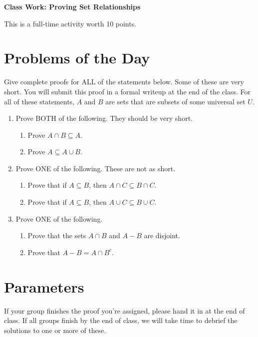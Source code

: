 \documentclass[11pt]{article}
\begin{document}
	
	\thispagestyle{empty}
	\renewcommand{\headrulewidth}{0.0pt}
	\thispagestyle{fancy}
	\lfoot{}
	\cfoot{}
	\rfoot{}	
	
	\vspace*{0in}

		\begin{center}
			\begin{large}
			\textbf{Class Work: Proving Set Relationships} \\
			\end{large}
			This is a full-time activity worth 10 points. 
			
		\end{center}
		

\section*{Problems of the Day}

Give complete proofs for ALL of the statements below. Some of these are very short. You will submit this proof in a formal writeup at the end of the class. For all of these statements, $A$ and $B$ are sets that are subsets of some universal set $U$. 

\begin{enumerate}
	\item Prove BOTH of the following. They should be very short. 
	\begin{enumerate}
		\item Prove $A \cap B \subseteq A$. 
		\item Prove $A \subseteq A \cup B$.
	\end{enumerate}
	\item Prove ONE of the following. These are not as short. 
	\begin{enumerate}
		\item Prove that if $A \subseteq B$, then $A \cap C \subseteq B \cap C$. 
		\item Prove that if $A \subseteq B$, then $A \cup C \subseteq B \cup C$. 
	\end{enumerate}
	\item Prove ONE of the following. 
	\begin{enumerate}
		\item Prove that the sets $A \cap B$ and $A - B$ are disjoint. 
		\item Prove that $A - B = A \cap B^c$. 
	\end{enumerate}
	
	 
	
\end{enumerate}

\section*{Parameters}

If your group finishes the proof you're assigned, please hand it in at the end of class. If all groups finish by the end of class, we will take time to debrief the solutions to one or more of these. 
\end{document}
